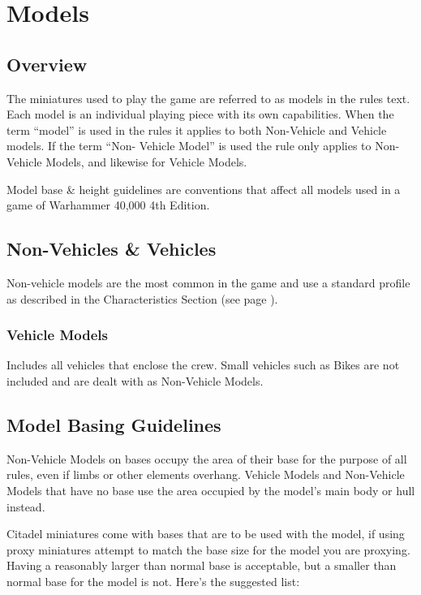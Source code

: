 
\chapter{Models}


\section{Overview}
The miniatures used to play the game are referred to as models in
the rules text. Each model is an individual playing piece with its
own capabilities. When the term ``model'' is used in the rules it
applies to both Non-Vehicle and Vehicle models. If the term ``Non-
Vehicle Model'' is used the rule only applies to Non-Vehicle
Models, and likewise for Vehicle Models.

Model base \& height guidelines are conventions that affect all
models used in a game of Warhammer 40,000 4th Edition.

\section{Non-Vehicles \& Vehicles}
Non-vehicle models are the most common in the game and use a
standard profile as described in the Characteristics Section (see page \pageref{sec:characteristics}).

\subsection{Vehicle Models}
Includes all vehicles that enclose the crew. Small vehicles such as
Bikes are not included and are dealt with as Non-Vehicle Models.

\section{Model Basing Guidelines}

Non-Vehicle Models on bases occupy the area of their base for the
purpose of all rules, even if limbs or other elements overhang.
Vehicle Models and Non-Vehicle Models that have no base use the
area occupied by the model's main body or hull instead.

Citadel miniatures come with bases that are to be used with the
model, if using proxy miniatures attempt to match the base size for
the model you are proxying. Having a reasonably larger than
normal base is acceptable, but a smaller than normal base for the
model is not. Here's the suggested list:


